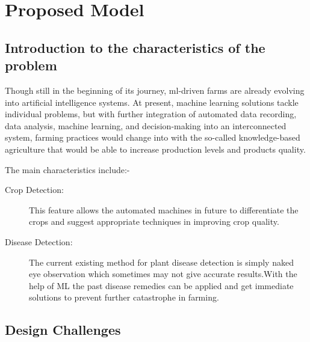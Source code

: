 \documentclass[../Report.tex]{subfiles}
\begin{document}
\chapter{Proposed Model}

\section{Introduction to the characteristics of the problem}

Though still in the beginning of its journey, \acrshort{ml}-driven farms are already evolving into artificial intelligence systems.
At present, machine learning solutions tackle individual problems, but with further integration of automated data recording,
data analysis, machine learning, and decision-making into an interconnected system, farming practices would change into with
the so-called knowledge-based agriculture that would be able to increase production levels and products quality.\par

\noindent
The main characteristics include:-
\begin{description}
  \item[Crop Detection: ] This feature allows the automated machines in future to differentiate the crops and suggest appropriate 
  techniques in improving crop quality.
  \item[Disease Detection: ] The current existing method for plant disease detection is simply naked eye observation which sometimes may not 
  give accurate results.With the help of ML the past disease remedies can be applied  and get immediate solutions to prevent further catastrophe
  in farming.
\end{description}

\section{Design Challenges}
\end{document}

